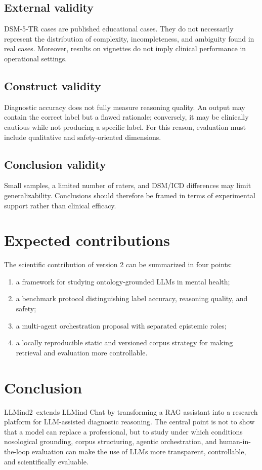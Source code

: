 \documentclass[11pt,a4paper]{article}
\newcommand{\llmind}{LLMind2}
\begin{document}
\subsection{External validity}
DSM-5-TR cases are published educational cases. They do not necessarily represent the distribution of complexity, incompleteness, and ambiguity found in real cases. Moreover, results on vignettes do not imply clinical performance in operational settings.

\subsection{Construct validity}
Diagnostic accuracy does not fully measure reasoning quality. An output may contain the correct label but a flawed rationale; conversely, it may be clinically cautious while not producing a specific label. For this reason, evaluation must include qualitative and safety-oriented dimensions.

\subsection{Conclusion validity}
Small samples, a limited number of raters, and DSM/ICD differences may limit generalizability. Conclusions should therefore be framed in terms of experimental support rather than clinical efficacy.

\section{Expected contributions}
The scientific contribution of version 2 can be summarized in four points:
\begin{enumerate}
  \item a framework for studying ontology-grounded LLMs in mental health;
  \item a benchmark protocol distinguishing label accuracy, reasoning quality, and safety;
  \item a multi-agent orchestration proposal with separated epistemic roles;
  \item a locally reproducible static and versioned corpus strategy for making retrieval and evaluation more controllable.
\end{enumerate}

\section{Conclusion}
\llmind\ extends LLMind Chat by transforming a RAG assistant into a research platform for LLM-assisted diagnostic reasoning. The central point is not to show that a model can replace a professional, but to study under which conditions nosological grounding, corpus structuring, agentic orchestration, and human-in-the-loop evaluation can make the use of LLMs more transparent, controllable, and scientifically evaluable.
\end{document}
